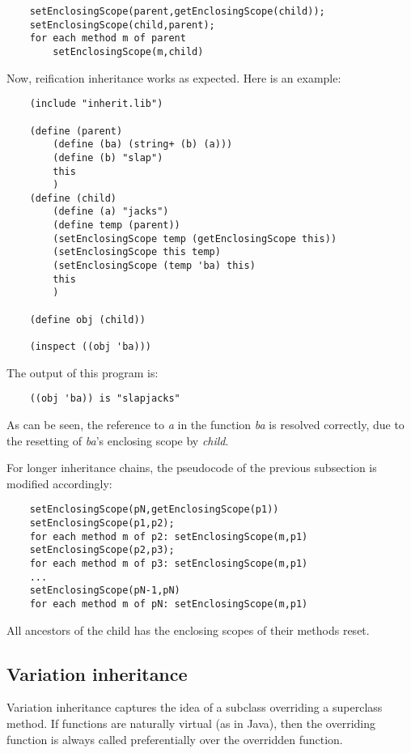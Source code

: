 {{\begin{verbatim}
    setEnclosingScope(parent,getEnclosingScope(child));
    setEnclosingScope(child,parent);
    for each method m of parent
        setEnclosingScope(m,child)
\end{verbatim}

Now, reification inheritance works as expected. Here is an example:

\begin{verbatim}
    (include "inherit.lib")

    (define (parent)
        (define (ba) (string+ (b) (a)))
        (define (b) "slap")
        this
        )
    (define (child)
        (define (a) "jacks")
        (define temp (parent))
        (setEnclosingScope temp (getEnclosingScope this))
        (setEnclosingScope this temp)
        (setEnclosingScope (temp 'ba) this)
        this
        )

    (define obj (child))

    (inspect ((obj 'ba)))
\end{verbatim}

The output of this program is:

\begin{verbatim}
    ((obj 'ba)) is "slapjacks"
\end{verbatim}

As can be seen, the reference to {\it a} in the function {\it ba} is
resolved correctly, due to the resetting of {\it ba}'s enclosing scope
by {\it child}.

For longer inheritance chains, the pseudocode of the previous subsection
is modified accordingly:

\begin{verbatim}
    setEnclosingScope(pN,getEnclosingScope(p1))
    setEnclosingScope(p1,p2);
    for each method m of p2: setEnclosingScope(m,p1)
    setEnclosingScope(p2,p3);
    for each method m of p3: setEnclosingScope(m,p1)
    ...
    setEnclosingScope(pN-1,pN)
    for each method m of pN: setEnclosingScope(m,p1)
\end{verbatim}

All ancestors of the child has the enclosing scopes of their methods reset.

\subsection{Variation inheritance}

Variation inheritance captures the idea of a subclass overriding a
superclass method. If functions are naturally virtual (as in Java),
then the overriding function is always called preferentially over the
overridden function.

}}
